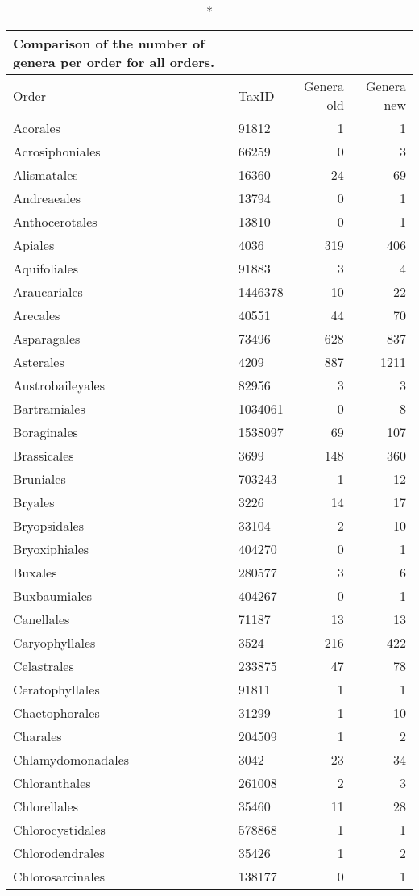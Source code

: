 \documentclass{article}
\begin{document}
\begin{longtabu}{lXRR}
\caption*{Comparison of the number of genera per order for all orders.}\\
\toprule
Order & TaxID & Genera old & Genera new \\
\midrule
\endhead
Acorales & 91812 & 1 & 1\\
Acrosiphoniales & 66259 & 0 & 3\\
Alismatales & 16360 & 24 & 69\\
Andreaeales & 13794 & 0 & 1\\
Anthocerotales & 13810 & 0 & 1\\
Apiales & 4036 & 319 & 406\\
Aquifoliales & 91883 & 3 & 4\\
Araucariales & 1446378 & 10 & 22\\
Arecales & 40551 & 44 & 70\\
Asparagales & 73496 & 628 & 837\\
Asterales & 4209 & 887 & 1211\\
Austrobaileyales & 82956 & 3 & 3\\
Bartramiales & 1034061 & 0 & 8\\
Boraginales & 1538097 & 69 & 107\\
Brassicales & 3699 & 148 & 360\\
Bruniales & 703243 & 1 & 12\\
Bryales & 3226 & 14 & 17\\
Bryopsidales & 33104 & 2 & 10\\
Bryoxiphiales & 404270 & 0 & 1\\
Buxales & 280577 & 3 & 6\\
Buxbaumiales & 404267 & 0 & 1\\
Canellales & 71187 & 13 & 13\\
Caryophyllales & 3524 & 216 & 422\\
Celastrales & 233875 & 47 & 78\\
Ceratophyllales & 91811 & 1 & 1\\
Chaetophorales & 31299 & 1 & 10\\
Charales & 204509 & 1 & 2\\
Chlamydomonadales & 3042 & 23 & 34\\
Chloranthales & 261008 & 2 & 3\\
Chlorellales & 35460 & 11 & 28\\
Chlorocystidales & 578868 & 1 & 1\\
Chlorodendrales & 35426 & 1 & 2\\
Chlorosarcinales & 138177 & 0 & 1\\

\end{longtabu}
\end{document}
